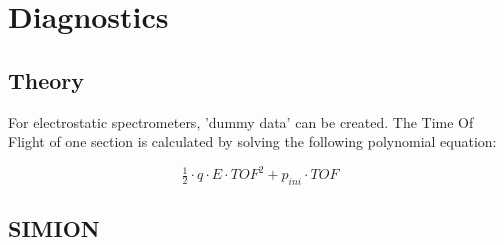 \newpage
\section{Diagnostics}

\subsection{Theory}

For electrostatic spectrometers, 'dummy data' can be created. The Time Of Flight of one section is calculated by solving the following polynomial equation:


\begin{equation}
\tfrac{1}{2} \cdot q \cdot E \cdot TOF^2 + p_{ini} \cdot TOF
\end{equation}


\subsection{SIMION}

